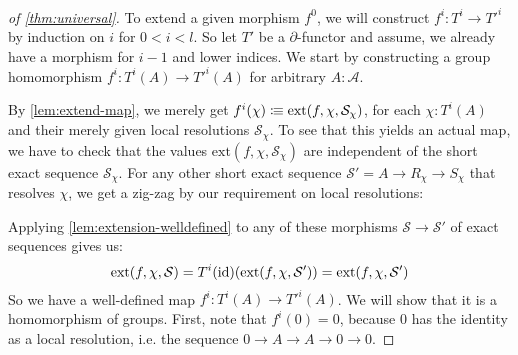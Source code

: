 \begin{proof}[of \cref{thm:universal}]
  To extend a given morphism $f^0$, 
  we will construct $f^i:T^i\to T'^i$ by induction on $i$ for $0<i<l$.
  So let $T'$ be a $\partial$-functor and assume, we already have a morphism for $i-1$ and lower indices.
  We start by constructing a group homomorphism $f^i:T^i(A)\to T'^i(A)$ for arbitrary $A:\mathcal A$.

  By \cref{lem:extend-map},
  we merely get $f^{i}(\chi)\vcentcolon\mspace{-1.2mu}\equiv \mathrm{ext}(f,\chi,\mathcal{S}_\chi)$,
  for each $\chi:T^i(A)$ and their merely given local resolutions $\mathcal{S}_\chi$.
  To see that this yields an actual map, we have to check that the
  values $\mathrm{ext}(f,\chi,\mathcal{S}_\chi)$ are independent of the short exact sequence $\mathcal{S}_\chi$.
  For any other short exact sequence $\mathcal{S}'=A\to R_\chi\to S_\chi$
  that resolves $\chi$, we get a zig-zag by our requirement on local resolutions:
  \begin{center}
  \end{center}
  Applying \cref{lem:extension-welldefined} to any of these morphisms $\mathcal{S}\to\mathcal{S}'$ of exact sequences
  gives us:
  \[ \mathrm{ext}(f,\chi,\mathcal{S}) = T^i(\mathrm{id})(\mathrm{ext}(f,\chi,\mathcal{S}')) = \mathrm{ext}(f,\chi,\mathcal{S}') \]
  So we have a well-defined map $f^{i}:T^i(A)\to T'^i(A)$.
  We will show that it is a homomorphism of groups.
  First, note that $f^i(0)=0$,
  because $0$ has the identity as a local resolution, i.e. the sequence $0\to A\to A\to 0\to 0$.
  

\end{proof}
